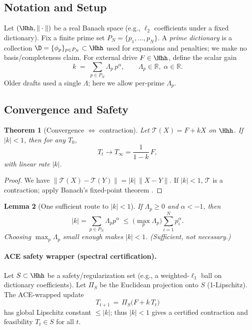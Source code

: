 \documentclass[11pt]{article}
\theoremstyle{plain}
\newtheorem{theorem}{Theorem}
\newtheorem{lemma}[theorem]{Lemma}
\theoremstyle{definition}
\theoremstyle{remark}
\newcommand{\R}{\mathbb{R}}
\begin{document}
\subsection{Notation and Setup}
Let $(\Hhh,\|\cdot\|)$ be a real Banach space (e.g., $\ell_2$ coefficients under a fixed dictionary). Fix a finite prime set $P_N=\{p_1,\dots,p_N\}$. A \emph{prime dictionary} is a collection $\D=\{\phi_p\}_{p\in P_N}\subset\Hhh$ used for expansions and penalties; we make no basis/completeness claim. For external drive $F\in\Hhh$, define the scalar gain
\begin{equation}
  k\;=\;\sum_{p\in P_N}\Lambda_p\,p^{\alpha},\qquad \Lambda_p\in\R,\;\alpha\in\R.
  \label{eq:gain}
\end{equation}
Older drafts used a single $\Lambda$; here we allow per-prime $\Lambda_p$.

\subsection{Convergence and Safety}
\begin{theorem}[Convergence $\Leftrightarrow$ contraction]\label{thm:contraction}
Let $\mathcal T(X)=F+kX$ on $\Hhh$. If $|k|<1$, then for any $T_0$,
\begin{equation*}
  T_t \to T_\infty = \frac{1}{1-k}\,F,
\end{equation*}
with linear rate $|k|$.
\end{theorem}
\begin{proof}
We have $\|\mathcal T(X)-\mathcal T(Y)\|=|k|\,\|X-Y\|$. If $|k|<1$, $\mathcal T$ is a contraction; apply Banach's fixed-point theorem \cite{BauschkeCombettes2017}.
\end{proof}

\begin{lemma}[One sufficient route to $|k|<1$]\label{lem:sufficient}
If $\Lambda_p\ge 0$ and $\alpha<-1$, then
\begin{equation*}
  |k|=\sum_{p\in P_N}\Lambda_p p^{\alpha}
  \;\le\; \Big(\max_{p}\Lambda_p\Big)\sum_{i=1}^{N}p_i^{\alpha}.
\end{equation*}
Choosing $\max_p\Lambda_p$ small enough makes $|k|<1$. \emph{(Sufficient, not necessary.)}
\end{lemma}

\paragraph{ACE safety wrapper (spectral certification).} Let $S\subset\Hhh$ be a safety/regularization set (e.g., a weighted-$\ell_1$ ball on dictionary coefficients). Let $\Pi_S$ be the Euclidean projection onto $S$ (1-Lipschitz). The ACE-wrapped update
\begin{equation}
  T_{t+1} \,=\, \Pi_S\!\big(F+k\,T_t\big)
  \label{eq:ace}
\end{equation}
has global Lipschitz constant $\le |k|$; thus $|k|<1$ gives a certified contraction and feasibility $T_t\in S$ for all $t$.
\end{document}
